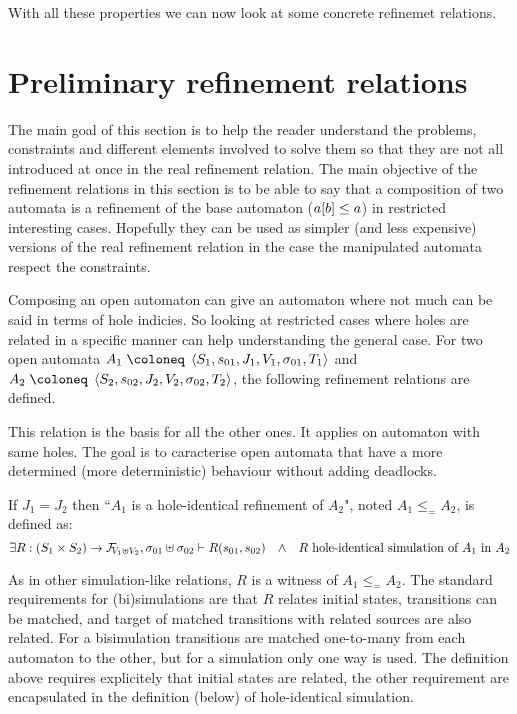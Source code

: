\documentclass{article}
\begin{document}
With all these properties we can now look at some concrete refinemet relations.


\section{Preliminary refinement relations}\label{sec:prelref}
The main goal of this section is to help the reader understand the problems, constraints and different elements involved to solve them so that they are not all introduced at once in the real refinement relation.
The main objective of the refinement relations in this section is to be able to say that a composition of two automata is a refinement of the base automaton (\(a{\left[b\right]} \leq a\)) in restricted interesting cases.
Hopefully they can be used as simpler (and less expensive) versions of the real refinement relation in the case the manipulated automata respect the constraints.

Composing an open automaton can give an automaton where not much can be said in terms of hole indicies.
So looking at restricted cases where holes are related in a specific manner can help understanding the general case.
For two open automata \(A_1 \defobject \OA{S_1}{s_{01}}{J_1}{V_1}{\sigma_{01}}{T_1}\) and \(A_2 \defobject \OA{S_2}{s_{02}}{J_2}{V_2}{\sigma_{02}}{T_2}\), the following refinement relations are defined.

This relation is the basis for all the other ones.
It applies on automaton with same holes.
The goal is to caracterise open automata that have a more determined (more deterministic) behaviour without adding deadlocks.
\begin{defi} %
If \(J_1 = J_2\) then ``\(A_1\) is a hole-identical refinement of \(A_2\)", noted \(A_1 \leq_= A_2\), is defined as:
\[ \exists R: \mpar{S_1 \times S_2} \to \rformulae[V_1 \uplus V_2], \sigma_{01} \uplus \sigma_{02} \vdash R\mpar{s_{01}, s_{02}} \qwedge R \text{ hole-identical simulation of } A_1 \text{ in } A_2 \]
\end{defi}
As in other simulation-like relations, \(R\) is a witness of \(A_1 \leq_= A_2\).
The standard requirements for (bi)simulations are that \(R\) relates initial states, transitions can be matched, and target of matched transitions with related sources are also related.
For a bisimulation transitions are matched one-to-many from each automaton to the other, but for a simulation only one way is used.
The definition above requires explicitely that initial states are related, the other requirement are encapsulated in the definition (below) of hole-identical simulation.
\end{document}

